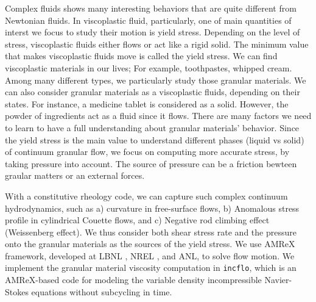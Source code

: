 Complex fluids shows many interesting behaviors that are quite different from Newtonian fluids. In viscoplastic fluid, particularly, one of main quantities of interst we focus to study their motion is yield stress. 
Depending on the level of stress, viscoplastic fluids either flows or act like a rigid solid. The minimum value that makes viscoplastic fluids move is called the yield stress. 
We can find viscoplastic materials in our lives; For example, toothpastes, whipped cream. 
Among many different types, we particularly study those granular materials.
We can also consider granular materials as a viscoplastic fluids, depending on their states. For instance, a medicine tablet is considered as a solid. However, the powder of ingredients act as a fluid since it flows. 
There are many factors we need to learn to have a full understanding about granular materials' behavior.
Since the yield stress is the main value to understand different phases (liquid vs solid) of continuum granular flow, we focus on computing more accurate stress, by taking pressure into account. The source of pressure can be a friction bewteen graular matters or an external forces.  
\par
With a constitutive rheology code, we can capture such complex continuum hydrodynamics, such as a) curvature in free-surface flows,
 b) Anomalous stress profile in cylindrical Couette flows, and c) Negative rod climbing effect (Weissenberg effect).
We thus consider both shear stress rate and the pressure onto the granular materials as the sources of the yield stress. 
We use AMReX framework, developed at LBNL , NREL , and ANL, to solve flow motion. We implement the granular material viscosity computation in \verb+incflo+, which is an AMReX-based code for modeling the variable density incompressible Navier-Stokes equations without subcycling in time.



